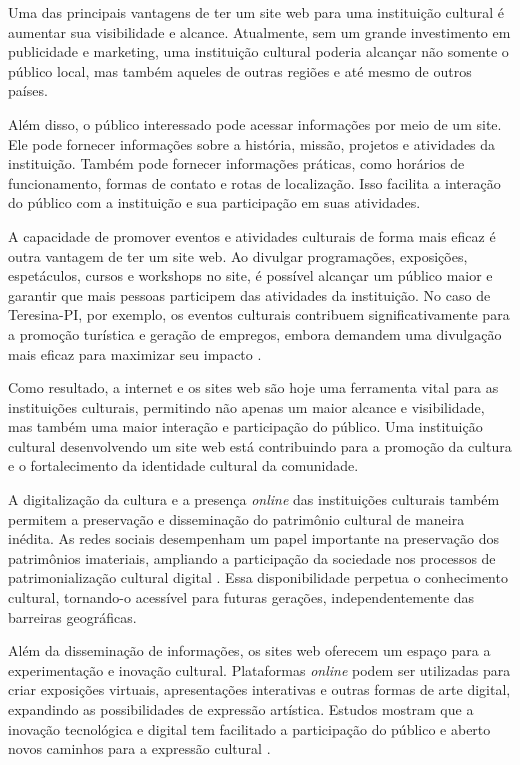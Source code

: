 Uma das principais vantagens de ter um site web para uma instituição cultural é aumentar sua visibilidade e alcance. Atualmente, sem um grande investimento em publicidade e marketing, uma instituição cultural poderia alcançar não somente o público local, mas também aqueles de outras regiões e até mesmo de outros países.

Além disso, o público interessado pode acessar informações por meio de um site. Ele pode fornecer informações sobre a história, missão, projetos e atividades da instituição. Também pode fornecer informações práticas, como horários de funcionamento, formas de contato e rotas de localização. Isso facilita a interação do público com a instituição e sua participação em suas atividades.

A capacidade de promover eventos e atividades culturais de forma mais eficaz é outra vantagem de ter um site web. Ao divulgar programações, exposições, espetáculos, cursos e workshops no site, é possível alcançar um público maior e garantir que mais pessoas participem das atividades da instituição. No caso de Teresina-PI, por exemplo, os eventos culturais contribuem significativamente para a promoção turística e geração de empregos, embora demandem uma divulgação mais eficaz para maximizar seu impacto \cite{gomes2009}.

Como resultado, a internet e os sites web são hoje uma ferramenta vital para as instituições culturais, permitindo não apenas um maior alcance e visibilidade, mas também uma maior interação e participação do público. Uma instituição cultural desenvolvendo um site web está contribuindo para a promoção da cultura e o fortalecimento da identidade cultural da comunidade.

A digitalização da cultura e a presença \textit{online} das instituições culturais também permitem a preservação e disseminação do patrimônio cultural de maneira inédita. As redes sociais desempenham um papel importante na preservação dos patrimônios imateriais, ampliando a participação da sociedade nos processos de patrimonialização cultural digital \cite{ramires2019}. Essa disponibilidade perpetua o conhecimento cultural, tornando-o acessível para futuras gerações, independentemente das barreiras geográficas.

Além da disseminação de informações, os sites web oferecem um espaço para a experimentação e inovação cultural. Plataformas \textit{online} podem ser utilizadas para criar exposições virtuais, apresentações interativas e outras formas de arte digital, expandindo as possibilidades de expressão artística. Estudos mostram que a inovação tecnológica e digital tem facilitado a participação do público e aberto novos caminhos para a expressão cultural \cite{lu2023}.


